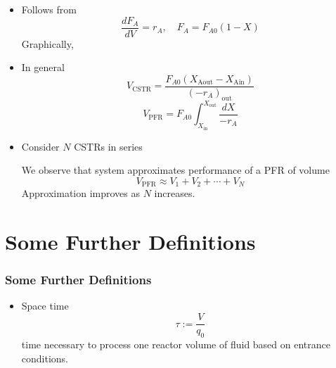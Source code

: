 \begin{frame}
	\begin{itemize}
		\item	Follows from $$\frac{dF_A}{dV} = r_A,\quad F_A = F_{A0}(1 - X)$$ Graphically,
	\end{itemize}
\end{frame}

\begin{frame}
	\begin{itemize}
		\item	In general $$V_\text{CSTR} = \frac{F_{A0}(X_\text{Aout} - X_\text{Ain})}{(-r_A)_\text{out}}$$ $$V_\text{PFR} = F_{A0}\int_{X_\text{in}}^{X_\text{out}}\frac{dX}{-r_A}$$
	\end{itemize}
\end{frame}

\begin{frame}
	\begin{itemize}
		\item	Consider $N$ CSTRs in series

		We observe that system approximates performance of a PFR of volume $$V_\text{PFR} \approx V_1 + V_2 + \cdots + V_N$$ Approximation improves as $N$ increases.
	\end{itemize}
\end{frame}

\section{Some Further Definitions}
\begin{frame}\frametitle{Some Further Definitions}
	\begin{itemize}
		\item	Space time $$\tau := \frac{V}{q_0}$$ time necessary to process one reactor volume of fluid based on entrance conditions.
	\end{itemize}
\end{frame}

